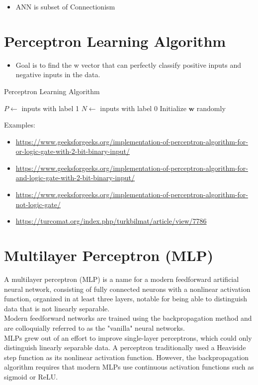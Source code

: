 \begin{itemize}
    \item ANN is subset of Connectionism
\end{itemize}


\section{Perceptron Learning Algorithm \cite{medium-perceptron-learning-algorithm}}\label{Perceptron Learning Algorithm}

\begin{itemize}
    \item Goal is to find the w vector that can perfectly classify positive inputs and negative inputs in the data.
\end{itemize}

\begin{algorithm}[H]
    \caption{Perceptron Learning Algorithm}
    $P \gets$ inputs with label 1\;
    $N \gets$ inputs with label 0\;
    Initialize $\textbf{w}$ randomly\;
\end{algorithm}

Examples:\\
\begin{itemize}
    \item \url{https://www.geeksforgeeks.org/implementation-of-perceptron-algorithm-for-or-logic-gate-with-2-bit-binary-input/}
    \item \url{https://www.geeksforgeeks.org/implementation-of-perceptron-algorithm-for-and-logic-gate-with-2-bit-binary-input/}
    \item \url{https://www.geeksforgeeks.org/implementation-of-perceptron-algorithm-for-not-logic-gate/}
    \item \url{https://turcomat.org/index.php/turkbilmat/article/view/7786}
\end{itemize}



\section{Multilayer Perceptron (MLP) \cite{wiki-Multilayer_perceptron}}\label{Multilayer_perceptron}
A multilayer perceptron (MLP) is a name for a modern feedforward artificial neural network, consisting of fully connected neurons with a nonlinear activation function, organized in at least three layers, notable for being able to distinguish data that is not linearly separable. \\
Modern feedforward networks are trained using the backpropagation method and are colloquially referred to as the "vanilla" neural networks.\\
MLPs grew out of an effort to improve single-layer perceptrons, which could only distinguish linearly separable data. A perceptron traditionally used a Heaviside step function as its nonlinear activation function. However, the backpropagation algorithm requires that modern MLPs use continuous activation functions such as sigmoid or ReLU.

